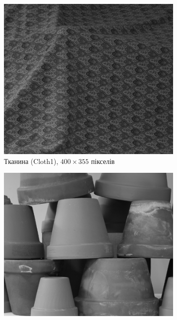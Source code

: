 \begin{figure}[h]
\centering
    \begin{subfigure}[t]{0.32\textwidth}
        \centering
        \includegraphics[width=\textwidth]{images/cloth_left}
        \caption{Тканина (Cloth1), $400 \times 355$ пікселів}
        \label{fig:cloth:left}
    \end{subfigure}
    \hfill
    \begin{subfigure}[t]{0.32\textwidth}
        \centering
        \includegraphics[width=\textwidth]{images/pots_left}

\end{subfigure}
\end{figure}
